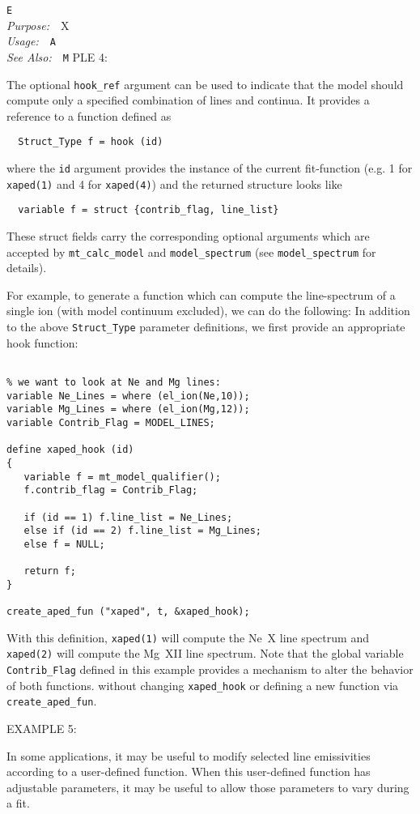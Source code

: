 \documentclass{book}
\makeatletter
\newif\ifpdf
\newenvironment{isisfunction}[4]%
{\index{{#1}@{\tt #1}}%
  \ifpdf
  \else
     \addcontentsline{toc}{subsection}{{#1} -- {#2}}
  \fi
  \vbox{
          \vspace*{\baselineskip}
          {\LARGE\tt #1}\vspace*{\baselineskip}\\
          {{\it Purpose:}~~{#2}}\\
          {{\it Usage:}~~{\tt #3}}\\
          {{\it See Also:}~~{\tt #4}}
       }
}%
{ }
\makeatother
\begin{document}
{\begin{isisfunction}
EXAMPLE 4:

The optional \verb|hook_ref| argument can be used to
indicate that the model should compute only a specified
combination of lines and continua.  It provides
a reference to a function defined as
\begin{verbatim}
  Struct_Type f = hook (id)
\end{verbatim}
where the \verb|id| argument provides the instance of
the current fit-function (e.g. 1 for \verb|xaped(1)|
and 4 for \verb|xaped(4)|) and the returned structure looks like
\begin{verbatim}
  variable f = struct {contrib_flag, line_list}
\end{verbatim}
These struct fields carry the corresponding optional arguments
which are accepted by \verb|mt_calc_model| and
\verb|model_spectrum| (see \verb|model_spectrum| for details).

For example, to generate a function which can compute the
line-spectrum of a single ion (with model continuum excluded), we
can do the following: In addition to the above \verb|Struct_Type|
parameter definitions, we first provide an appropriate hook
function:

\begin{verbatim}

% we want to look at Ne and Mg lines:
variable Ne_Lines = where (el_ion(Ne,10));
variable Mg_Lines = where (el_ion(Mg,12));
variable Contrib_Flag = MODEL_LINES;

define xaped_hook (id)
{
   variable f = mt_model_qualifier();
   f.contrib_flag = Contrib_Flag;

   if (id == 1) f.line_list = Ne_Lines;
   else if (id == 2) f.line_list = Mg_Lines;
   else f = NULL;

   return f;
}

create_aped_fun ("xaped", t, &xaped_hook);
\end{verbatim}

With this definition, \verb|xaped(1)| will compute the Ne~X line
spectrum and \verb|xaped(2)| will compute the Mg~XII line
spectrum.  Note that the global variable \verb|Contrib_Flag|
defined in this example provides a mechanism to alter the behavior
of both functions. without changing \verb|xaped_hook| or defining
a new function via \verb|create_aped_fun|.

EXAMPLE 5:

In some applications, it may be useful to modify selected line
emissivities according to a user-defined function. When this
user-defined function has adjustable parameters, it may be
useful to allow those parameters to vary during a fit.


\end{isisfunction}}
\end{document}

